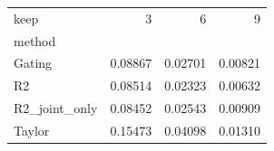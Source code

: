 \begin{tabular}{lrrr}
\toprule
keep & 3 & 6 & 9 \\
method &  &  &  \\
\midrule
Gating & 0.08867 & 0.02701 & 0.00821 \\
R2 & 0.08514 & 0.02323 & 0.00632 \\
R2_joint_only & 0.08452 & 0.02543 & 0.00909 \\
Taylor & 0.15473 & 0.04098 & 0.01310 \\
\bottomrule
\end{tabular}

